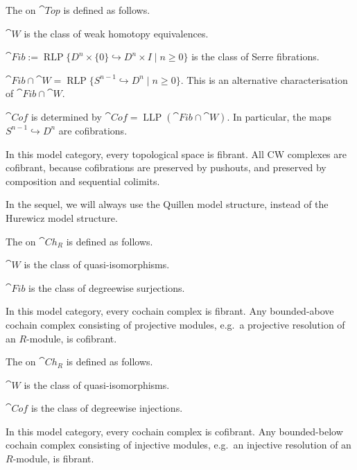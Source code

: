 \begin{example}
    The  on $\cat{Top}$ is defined as follows.
    \begin{itms}
        \item $\cat{W}$ is the class of weak homotopy equivalences.
        \item $\cat{Fib}:=\operatorname{RLP}\{D^n\times\{0\}\hookrightarrow D^n\times I\mid n\geq0\}$
        is the class of Serre fibrations.
        \item $\cat{Fib}\cap\cat W=\operatorname{RLP}\{S^{n-1}\hookrightarrow D^n\mid n\geq0\}$.
        This is an alternative characterisation of $\cat{Fib}\cap\cat W$.
        \item $\cat{Cof}$ is determined by $\cat{Cof}=\operatorname{LLP}(\cat{Fib}\cap\cat W)$.
        In particular, the maps $S^{n-1}\hookrightarrow D^n$ are cofibrations.
    \end{itms}
    In this model category, every topological space is fibrant.
    All CW complexes are cofibrant,
    because cofibrations are preserved by pushouts,
    and preserved by composition and sequential colimits. \varqed
\end{example}

In the sequel, we will always use the Quillen model structure,
instead of the Hurewicz model structure.

\begin{example}
    The  on $\cat{Ch}_R$ is defined as follows.
    \begin{itms}
        \item $\cat{W}$ is the class of quasi-isomorphisms.
        \item $\cat{Fib}$ is the class of degreewise surjections.
    \end{itms}
    In this model category, every cochain complex is fibrant.
    Any bounded-above cochain complex consisting of projective modules,
    e.g.\ a projective resolution of an $R$-module,
    is cofibrant. \varqed
\end{example}

\begin{example}
    The  on $\cat{Ch}_R$ is defined as follows.
    \begin{itms}
        \item $\cat{W}$ is the class of quasi-isomorphisms.
        \item $\cat{Cof}$ is the class of degreewise injections.
    \end{itms}
    In this model category, every cochain complex is cofibrant.
    Any bounded-below cochain complex consisting of injective modules,
    e.g.\ an injective resolution of an $R$-module,
    is fibrant. \varqed
\end{example}


